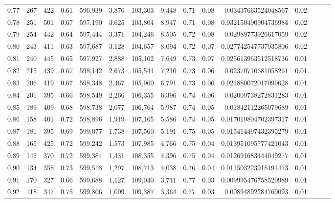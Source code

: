 \begin{tabular}{rrrrrrrrrrrrrrr}
0.77 &     267 &    422 &  0.61 &  596,939 &    3,876 &  103,303 &    9,448 &  0.71 &  0.08 &    0.03437663524048567 &      0.02 \\
0.78 &     251 &    501 &  0.67 &  597,190 &    3,625 &  103,804 &    8,947 &  0.71 &  0.08 &   0.032150490904736984 &      0.02 \\
0.79 &     254 &    442 &  0.64 &  597,444 &    3,371 &  104,246 &    8,505 &  0.72 &  0.08 &    0.02989773926617059 &      0.02 \\
0.80 &     243 &    411 &  0.63 &  597,687 &    3,128 &  104,657 &    8,094 &  0.72 &  0.07 &   0.027742547737935806 &      0.02 \\
0.81 &     240 &    445 &  0.65 &  597,927 &    2,888 &  105,102 &    7,649 &  0.73 &  0.07 &   0.025613963512518736 &      0.01 \\
0.82 &     215 &    439 &  0.67 &  598,142 &    2,673 &  105,541 &    7,210 &  0.73 &  0.06 &    0.02370710681058261 &      0.01 \\
0.83 &     206 &    419 &  0.67 &  598,348 &    2,467 &  105,960 &    6,791 &  0.73 &  0.06 &   0.021880072017099628 &      0.01 \\
0.84 &     201 &    395 &  0.66 &  598,549 &    2,266 &  106,355 &    6,396 &  0.74 &  0.06 &    0.02009738272831283 &      0.01 \\
0.85 &     189 &    409 &  0.68 &  598,738 &    2,077 &  106,764 &    5,987 &  0.74 &  0.05 &    0.01842112265079689 &      0.01 \\
0.86 &     158 &    401 &  0.72 &  598,896 &    1,919 &  107,165 &    5,586 &  0.74 &  0.05 &   0.017019804702397317 &      0.01 \\
0.87 &     181 &    395 &  0.69 &  599,077 &    1,738 &  107,560 &    5,191 &  0.75 &  0.05 &   0.015414497432395279 &      0.01 \\
0.88 &     165 &    425 &  0.72 &  599,242 &    1,573 &  107,985 &    4,766 &  0.75 &  0.04 &   0.013951095777421043 &      0.01 \\
0.89 &     142 &    370 &  0.72 &  599,384 &    1,431 &  108,355 &    4,396 &  0.75 &  0.04 &   0.012691683444049277 &      0.01 \\
0.90 &     134 &    358 &  0.73 &  599,518 &    1,297 &  108,713 &    4,038 &  0.76 &  0.04 &   0.011503223918191413 &      0.01 \\
0.91 &     170 &    327 &  0.66 &  599,688 &    1,127 &  109,040 &    3,711 &  0.77 &  0.03 &   0.009995476758520989 &      0.01 \\
0.92 &     118 &    347 &  0.75 &  599,806 &    1,009 &  109,387 &    3,364 &  0.77 &  0.03 &    0.00894892284769093 &      0.01 \\

\end{tabular}
